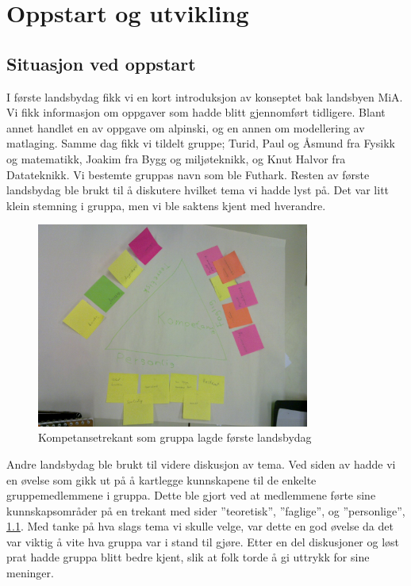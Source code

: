 
\chapter{Oppstart og utvikling}

\section{Situasjon ved oppstart}

I første landsbydag fikk vi en kort introduksjon av konseptet bak landsbyen MiA.
Vi fikk informasjon om oppgaver som hadde blitt gjennomført tidligere. Blant
annet handlet en av oppgave om alpinski, og en annen om modellering av
matlaging. Samme dag fikk vi tildelt gruppe; Turid, Paul og Åsmund fra Fysikk og
matematikk, Joakim fra Bygg og miljøteknikk, og Knut Halvor fra Datateknikk. Vi
bestemte gruppas navn som ble Futhark. Resten av første landsbydag ble brukt
til å diskutere hvilket tema vi hadde lyst på. Det var litt klein stemning i
gruppa, men vi ble saktens kjent med hverandre. \\ 

\begin{figure}[ht!]
  \begin{center}
    \includegraphics[width=0.8\textwidth]{kompetansetrekant.jpg}
  \end{center}
  \caption{Kompetansetrekant som gruppa lagde første landsbydag}
  \label{fig:kompetansetrekant}
\end{figure}

Andre landsbydag ble brukt til videre diskusjon av tema. Ved siden av hadde vi
en øvelse som gikk ut på å kartlegge kunnskapene til de enkelte gruppemedlemmene
i gruppa. Dette ble gjort ved at medlemmene førte sine kunnskapsområder på
en trekant med sider ”teoretisk”, ”faglige”, og ”personlige”,
\cref{fig:kompetansetrekant}. Med tanke på hva slags tema vi skulle velge, var
dette en god øvelse da
det var viktig å vite hva gruppa var i stand til gjøre. Etter en del diskusjoner
og løst prat hadde gruppa blitt bedre kjent, slik at folk torde å gi uttrykk for sine 
meninger.\\
 

